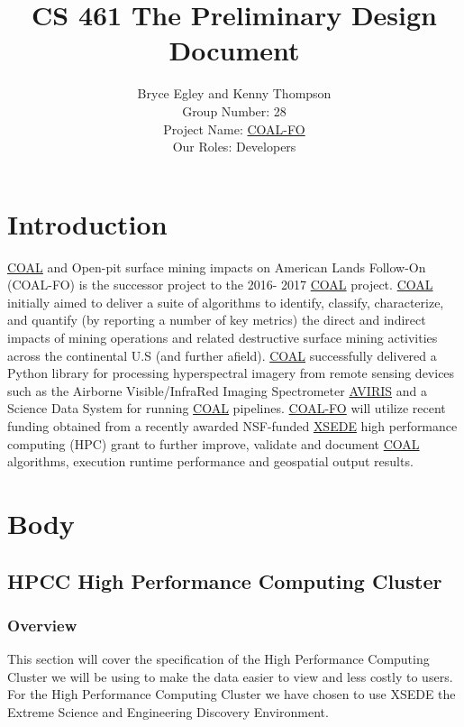 \documentclass[10pt,draftclsnofoot,onecolumn,journal,compsoc]{IEEEtran}
\title{CS 461 The Preliminary Design Document}
\author{Bryce Egley and Kenny Thompson \\ Group Number: 28 \\ Project Name: \href{http://eecs.oregonstate.edu/capstone/submission/?page=preview\&pid=320}{COAL-FO} \\ Our Roles: Developers}
\date{}
\begin{document}
\maketitle
\newpage

\tableofcontents

\newpage

\section{Introduction}
	\href{https://capstone-coal.github.io/}{COAL} and Open-pit surface mining impacts on American Lands Follow-On (COAL-FO) is the successor project to the 2016-
2017 \href{https://capstone-coal.github.io/}{COAL} project. \href{https://capstone-coal.github.io/}{COAL} initially aimed to deliver a suite of algorithms to identify, classify, characterize, and quantify (by reporting a
number of key metrics) the direct and indirect impacts of mining operations and related destructive surface mining activities across the
continental U.S (and further afield). \href{https://capstone-coal.github.io/}{COAL} successfully delivered a Python library for processing hyperspectral imagery from remote
sensing devices such as the Airborne Visible/InfraRed Imaging Spectrometer \href{https://aviris.jpl.nasa.gov/}{AVIRIS} and a Science Data System for running \href{https://capstone-coal.github.io/}{COAL}
pipelines. \href{http://eecs.oregonstate.edu/capstone/cs/capstone.cgi?project=320}{COAL-FO} will utilize recent funding obtained from a recently awarded NSF-funded \href{https://www.xsede.org/}{XSEDE} high performance computing
(HPC) grant to further improve, validate and document \href{https://capstone-coal.github.io/}{COAL} algorithms, execution runtime performance and geospatial output
results.\cite{1}

\section{Body}

\subsection{HPCC High Performance Computing Cluster}

\subsubsection{Overview}

\noindent This section will cover the specification of the High Performance Computing Cluster we will be using to make the data easier to view and less costly to users. For the High Performance Computing Cluster we have chosen to use XSEDE the Extreme Science and Engineering Discovery Environment.
\end{document}
